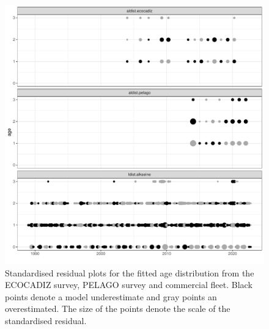 \documentclass[review]{elsarticle}
\begin{document}


\begin{figure}
\centering
 \includegraphics{./resialdist.pdf}
 \caption{ Standardised residual plots for the fitted age distribution
from the ECOCADIZ survey, PELAGO survey and commercial fleet. Black points denote a model underestimate and
gray points an overestimated. The size of the points denote the scale of the standardised
residual.}
 \label{resialdist}
\end{figure}
\end{document}
